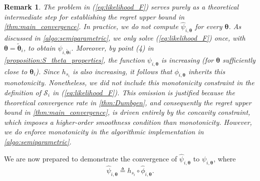 \documentclass{article} %
\newtheorem{remark}[theorem]{Remark}
\begin{document}
\begin{remark}
The problem in (\ref{eq:likelihood_F}) serves purely as a theoretical intermediate step for establishing the regret upper bound in \cref{thm:main_convergence}. In practice, we do not compute $\hat{\psi}_{i,\boldsymbol{\theta}}$ for every $\boldsymbol{\theta}$. As discussed in \cref{algo:semiparametric}, we only solve (\ref{eq:likelihood_F}) once, with $\boldsymbol{\theta} = \tilde{\boldsymbol{\theta}}_i$, to obtain $\hat{\psi}_{i,\tilde{\boldsymbol{\theta}}i}$.
Moreover, by point \textit{(4)} in \cref{proposition:S_theta_properties}, the function $\psi_{i,\boldsymbol{\theta}}$ is increasing (for $\boldsymbol{\theta}$ sufficiently close to $\boldsymbol{\theta}_i$). Since $h_{s_i}$ is also increasing, it follows that $\phi_{i,\boldsymbol{\theta}}$ inherits this monotonicity. Nonetheless, we did not include this monotonicity constraint in the definition of $\mathcal{S}_i$ in (\ref{eq:likelihood_F}). This omission is justified because the theoretical convergence rate in \cref{thm:Dumbgen}, and consequently the regret upper bound in \cref{thm:main_convergence}, is driven entirely by the concavity constraint, which imposes a higher-order smoothness condition than monotonicity.
However, we do enforce monotonicity in the algorithmic implementation in \cref{algo:semiparametric}. 
\end{remark}

We are now prepared to demonstrate the convergence of $\widehat \psi_{i,\boldsymbol{\theta}}$ to $\psi_{i,\boldsymbol{\theta}}$, where
$$
\widehat \psi_{i,\boldsymbol{\theta}} \triangleq h_{s_i} \circ \widehat \phi_{i,\boldsymbol{\theta}}.
$$
\end{document}

